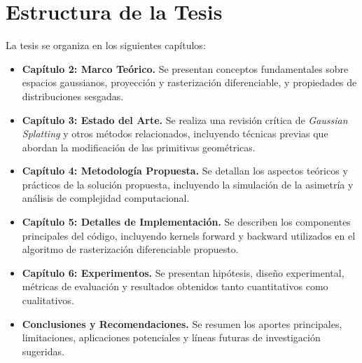 \section{Estructura de la Tesis}
La tesis se organiza en los siguientes capítulos:
\begin{itemize}
    \item \textbf{Capítulo 2: Marco Teórico.} Se presentan conceptos fundamentales sobre espacios gaussianos, proyección y rasterización diferenciable, 
    y propiedades de distribuciones sesgadas.
    \item \textbf{Capítulo 3: Estado del Arte.} Se realiza una revisión crítica de \textit{Gaussian Splatting} y otros métodos relacionados, incluyendo técnicas 
    previas que abordan la modificación de las primitivas geométricas.
    \item \textbf{Capítulo 4: Metodología Propuesta.} Se detallan los aspectos teóricos y prácticos de la solución propuesta, incluyendo la simulación 
    de la asimetría y análisis de complejidad computacional.
    \item \textbf{Capítulo 5: Detalles de Implementación.} Se describen los componentes principales del código, incluyendo kernels forward y backward 
    utilizados en el algoritmo de rasterización diferenciable propuesto.
    \item \textbf{Capítulo 6: Experimentos.} Se presentan hipótesis, diseño experimental, métricas de evaluación y resultados obtenidos tanto cuantitativos 
    como cualitativos.
    \item \textbf{Conclusiones y Recomendaciones.} Se resumen los aportes principales, limitaciones, aplicaciones potenciales y líneas futuras de 
    investigación sugeridas.
\end{itemize}
